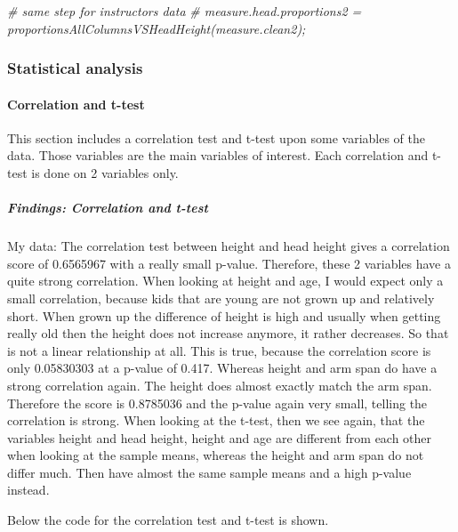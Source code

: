 \documentclass[]{article}
\newenvironment{Shaded}{\begin{snugshade}}{\end{snugshade}}
\newcommand{\CommentTok}[1]{\textcolor[rgb]{0.56,0.35,0.01}{\textit{#1}}}
\begin{document}
\begin{Shaded}
\begin{Highlighting}[]
\CommentTok{\# same step for instructors data}
\CommentTok{\# measure.head.proportions2 = proportionsAllColumnsVSHeadHeight(measure.clean2);}
\end{Highlighting}
\end{Shaded}

\newpage

\subsubsection{Statistical analysis}
\label{sec:appendix-statistical-analysis}

\paragraph{Correlation and t-test}
\label{sec:appendix-correlation-and-ttest}

This section includes a correlation test and t-test upon some variables
of the data. Those variables are the main variables of interest. Each
correlation and t-test is done on 2 variables only.

\subparagraph{Findings: Correlation and t-test}
\label{sec:appendix-findings-correlation-and-ttest}

My data: The correlation test between height and head height gives a
correlation score of 0.6565967 with a really small p-value. Therefore,
these 2 variables have a quite strong correlation. When looking at
height and age, I would expect only a small correlation, because kids
that are young are not grown up and relatively short. When grown up the
difference of height is high and usually when getting really old then
the height does not increase anymore, it rather decreases. So that is
not a linear relationship at all. This is true, because the correlation
score is only 0.05830303 at a p-value of 0.417. Whereas height and arm
span do have a strong correlation again. The height does almost exactly
match the arm span. Therefore the score is 0.8785036 and the p-value
again very small, telling the correlation is strong. When looking at the
t-test, then we see again, that the variables height and head height,
height and age are different from each other when looking at the sample
means, whereas the height and arm span do not differ much. Then have
almost the same sample means and a high p-value instead.

Below the code for the correlation test and t-test is shown.
\end{document}
